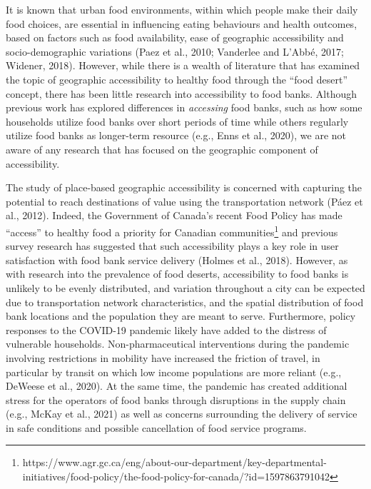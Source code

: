 \documentclass[]{elsarticle} %
\begin{document}
It is known that urban food environments, within which people make their
daily food choices, are essential in influencing eating behaviours and
health outcomes, based on factors such as food availability, ease of
geographic accessibility and socio-demographic variations (Paez et al.,
2010; Vanderlee and L'Abbé, 2017; Widener, 2018). However, while there
is a wealth of literature that has examined the topic of geographic
accessibility to healthy food through the ``food desert'' concept, there
has been little research into accessibility to food banks. Although
previous work has explored differences in \emph{accessing} food banks,
such as how some households utilize food banks over short periods of
time while others regularly utilize food banks as longer-term resource
(e.g., Enns et al., 2020), we are not aware of any research that has
focused on the geographic component of accessibility.

The study of place-based geographic accessibility is concerned with
capturing the potential to reach destinations of value using the
transportation network (Páez et al., 2012). Indeed, the Government of
Canada's recent Food Policy has made ``access'' to healthy food a
priority for Canadian communities\footnote{https://www.agr.gc.ca/eng/about-our-department/key-departmental-initiatives/food-policy/the-food-policy-for-canada/?id=1597863791042}
and previous survey research has suggested that such accessibility plays
a key role in user satisfaction with food bank service delivery (Holmes
et al., 2018). However, as with research into the prevalence of food
deserts, accessibility to food banks is unlikely to be evenly
distributed, and variation throughout a city can be expected due to
transportation network characteristics, and the spatial distribution of
food bank locations and the population they are meant to serve.
Furthermore, policy responses to the COVID-19 pandemic likely have added
to the distress of vulnerable households. Non-pharmaceutical
interventions during the pandemic involving restrictions in mobility
have increased the friction of travel, in particular by transit on which
low income populations are more reliant (e.g., DeWeese et al., 2020). At
the same time, the pandemic has created additional stress for the
operators of food banks through disruptions in the supply chain (e.g.,
McKay et al., 2021) as well as concerns surrounding the delivery of
service in safe conditions and possible cancellation of food service
programs.
\end{document}
